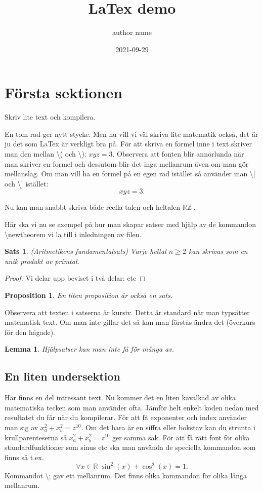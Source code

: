 \documentclass{article}
\title{LaTex demo}
\author{author name}
\date{2021-09-29}
\newcommand{\tb}{\textbackslash}  %
\newcommand{\R}{\mathbb{R}}       %
\newcommand{\Z}{\mathbb{Z}}       %
\newtheorem{sats}{Sats}
\newtheorem{prop}{Proposition}
\newtheorem{lemma}{Lemma}
\begin{document}
\maketitle


\section{Första sektionen}

Skriv lite text och kompilera.

En tom rad ger nytt stycke. Men nu vill vi väl skriva lite matematik också,
det är ju det som LaTex är verkligt bra på. För att skriva en formel inne i text
skriver man den mellan \textbackslash( och \textbackslash): \( x y z=3 \). Observera
att fonten blir annorlunda när man skriver en formel och dessutom blir det 
inga mellanrum även om man gör mellanslag. Om man vill ha en formel på en egen
rad istället så använder man  \textbackslash [ och \textbackslash ] istället:
\[
x y z = 3.
\]

Nu kan man snabbt skriva både reella talen och heltalen \( \R\Z\ \). 

Här ska vi nu se exempel på hur man skapar satser med hjälp av de kommandon
\tb newtheorem vi la till i inledningen av filen.

\begin{sats}
(Aritmetikens fundamentalsats) Varje heltal \(n\geq 2\) kan skrivas som
en unik produkt av primtal.
\end{sats}

\begin{proof}
Vi delar upp beviset i två delar:  etc
\end{proof}

\begin{prop}
En liten proposition är också en sats.
\end{prop}

Observera att texten i satserna är kursiv. Detta är standard när man typsätter
matematisk text. Om man inte gillar det så kan man förstås ändra det (överkurs
för den hågade).

\begin{lemma}
Hjälpsatser kan man inte få för många av.
\end{lemma}

\subsection{En liten undersektion}
Här finns en del intressant text. Nu kommer det en liten kavalkad av olika
matematiska tecken som man använder ofta. Jämför helt enkelt koden nedan med
resultatet du får när du kompilerar. För att få exponenter och index använder
man sig av \(x_{a}^{2} + x_{b}^{2} = z^{10}\). Om det bara är en siffra eller
bokstav kan du strunta i krullparenteserna så \(x_a^2 + x_b^2 = z^{10}\)
ger samma sak. För att få rätt font för olika standardfunktioner som sinus etc ska man använda de
speciella kommandon som finns så t.ex. 
\[
\forall x\in\mathbb{R}\; \sin^2(x)+\cos^2(x) = 1.
\]
Kommandot \textbackslash; gav ett mellanrum. Det finns olika kommandon för 
olika långa mellanrum.
\end{document}
